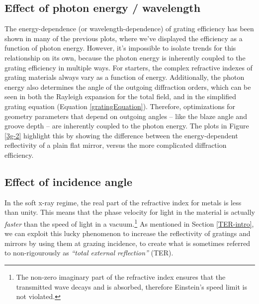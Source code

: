 \subsection{Effect of photon energy / wavelength}
The energy-dependence (or wavelength-dependence) of grating efficiency has been shown in many of the previous plots, where we've displayed the efficiency as a function of photon energy.  However, it's impossible to isolate trends for this relationship on its own, because the photon energy is inherently coupled to the grating efficiency in multiple ways.  For starters, the complex refractive indexes of grating materials always vary as a function of energy.  Additionally, the photon energy also determines the angle of the outgoing diffraction orders, which can be seen in both the Rayleigh expansion for the total field, and in the simplified grating equation (Equation \ref{gratingEquation}).  Therefore, optimizations for geometry parameters that depend on outgoing angles -- like the blaze angle and groove depth -- are inherently coupled to the photon energy.  The plots in Figure \ref{3g-2} highlight this by showing the difference between the energy-dependent reflectivity of a plain flat mirror, versus the more complicated diffraction efficiency.

\subsection{Effect of incidence angle}
In the soft x-ray regime, the real part of the refractive index for metals is less than unity.  This means that the phase velocity for light in the material is actually \emph{faster} than the speed of light in a vacuum.\footnote{The non-zero imaginary part of the refractive index ensures that the transmitted wave decays and is absorbed, therefore Einstein's speed limit is not violated.}  As mentioned in Section \ref{TER-intro}, we can exploit this lucky phenomenon to increase the reflectivity of gratings and mirrors by using them at grazing incidence, to create what is sometimes referred to non-rigourously as \emph{``total external reflection''} (TER).


